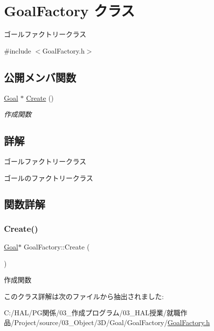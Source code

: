 \hypertarget{class_goal_factory}{}\section{Goal\+Factory クラス}
\label{class_goal_factory}


ゴールファクトリークラス  




{\ttfamily \#include $<$Goal\+Factory.\+h$>$}

\subsection*{公開メンバ関数}
\begin{DoxyCompactItemize}
\item 
\mbox{\hyperlink{class_goal}{Goal}} $\ast$ \mbox{\hyperlink{class_goal_factory_af0b52f5fd6e567a05985285369be7b2e}{Create}} ()
\begin{DoxyCompactList}\small\item\em 作成関数 \end{DoxyCompactList}\end{DoxyCompactItemize}


\subsection{詳解}
ゴールファクトリークラス 

ゴールのファクトリークラス 

\subsection{関数詳解}
\mbox{\label{class_goal_factory_af0b52f5fd6e567a05985285369be7b2e}} 
\subsubsection{\texorpdfstring{Create()}{Create()}}
{\footnotesize\ttfamily \mbox{\hyperlink{class_goal}{Goal}}$\ast$ Goal\+Factory\+::\+Create (\begin{DoxyParamCaption}{ }\end{DoxyParamCaption})\hspace{0.3cm}{\ttfamily [inline]}}



作成関数 



このクラス詳解は次のファイルから抽出されました\+:\begin{DoxyCompactItemize}
\item 
C\+:/\+H\+A\+L/\+P\+G関係/03\+\_\+作成プログラム/03\+\_\+\+H\+A\+L授業/就職作品/\+Project/source/03\+\_\+\+Object/3\+D/\+Goal/\+Goal\+Factory/\mbox{\hyperlink{_goal_factory_8h}{Goal\+Factory.\+h}}\end{DoxyCompactItemize}
